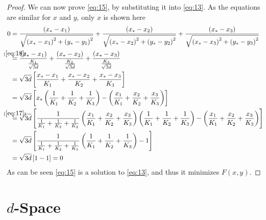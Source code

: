 \begin{proof}
We can now prove \cref{eq:15}, by substituting it into \cref{eq:13}. As the
equations are similar for $x$ and $y$, only $x$ is shown here
%
\begin{align}
  0
  &= \frac{(x_\ast - x_1)}{\sqrt{{(x_\ast - x_1)}^2 + {(y_\ast - y_1)}^2}} +
    \frac{(x_\ast - x_2)}{\sqrt{{(x_\ast - x_2)}^2 + {(y_\ast - y_2)}^2}} +
    \frac{(x_\ast - x_3)}{\sqrt{{(x_\ast - x_3)}^2 + {(y_\ast - y_3)}^2}} \\
  &\stackrel{\mathclap{(\ref{eq:18})}}=
    \frac{(x_\ast - x_1)}{\frac{K_1}{\sqrt{3 d}}} +
    \frac{(x_\ast - x_2)}{\frac{K_2}{\sqrt{3 d}}} +
    \frac{(x_\ast - x_3)}{\frac{K_3}{\sqrt{3 d}}} \\
  &= \sqrt{3 d} \left[
    \frac{x_\ast - x_1}{K_1} +
    \frac{x_\ast - x_2}{K_2} +
    \frac{x_\ast - x_3}{K_3} \right] \\
  &= \sqrt{3 d} \left[
    x_\ast \left( \frac{1}{K_1} + \frac{1}{K_2} + \frac{1}{K_3} \right) -
    \left( \frac{x_1}{K_1} + \frac{x_2}{K_2} + \frac{x_3}{K_3} \right)
    \right] \\
  &\stackrel{\mathclap{(\ref{eq:17})}}=
    \sqrt{3 d} \left[
    \frac{1}{\frac{1}{K_1} + \frac{1}{K_2} + \frac{1}{K_3}} \left( \frac{x_1}{K_1} +
    \frac{x_2}{K_2} + \frac{x_3}{K_3} \right)
    \left( \frac{1}{K_1} + \frac{1}{K_2} + \frac{1}{K_3} \right) -
    \left( \frac{x_1}{K_1} + \frac{x_2}{K_2} + \frac{x_3}{K_3} \right)
    \right] \\
  &= \sqrt{3 d} \left[
    \frac{1}{\frac{1}{K_1} + \frac{1}{K_2} + \frac{1}{K_3}}
    \left( \frac{1}{K_1} + \frac{1}{K_2} + \frac{1}{K_3} \right) -
    1 \right] \\
  &= \sqrt{3 d} \left[ 1 - 1 \right] = 0
\end{align}
%
As can be seen \cref{eq:15} is a solution to \cref{eq:13}, and thus it minimizes
$F(x,y)$.
\end{proof}

\section{$d$-Space}
\label{sec:d-space}

